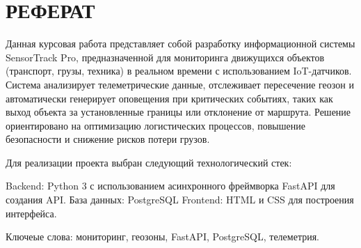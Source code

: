 \chapter*{РЕФЕРАТ}

Данная курсовая работа представляет собой разработку информационной системы SensorTrack Pro, предназначенной для мониторинга движущихся объектов (транспорт, грузы, техника) в реальном времени с использованием IoT-датчиков. Система анализирует телеметрические данные, отслеживает пересечение геозон и автоматически генерирует оповещения при критических событиях, таких как выход объекта за установленные границы или отклонение от маршрута. Решение ориентировано на оптимизацию логистических процессов, повышение безопасности и снижение рисков потери грузов.

Для реализации проекта выбран следующий технологический стек:

Backend: Python 3 с использованием асинхронного фреймворка FastAPI для создания API.
База данных: PostgreSQL
Frontend: HTML и CSS для построения интерфейса.

Ключеые слова: мониторинг, геозоны, FastAPI, PostgreSQL, телеметрия.


